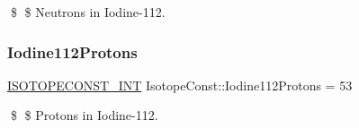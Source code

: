 \$ \$ Neutrons in Iodine-\/112. \mbox{\label{group___isotope_const-_iodine-_i112_ga3b84699a7e63e5a551659592f47b2ebe}} 
\subsubsection{\texorpdfstring{Iodine112\+Protons}{Iodine112Protons}}
{\footnotesize\ttfamily \mbox{\hyperlink{group___isotope_const-_macros_ga5f18360b3e99483a35c32d789e62621c}{I\+S\+O\+T\+O\+P\+E\+C\+O\+N\+S\+T\+\_\+\+I\+NT}} Isotope\+Const\+::\+Iodine112\+Protons = 53}

\$ \$ Protons in Iodine-\/112. 